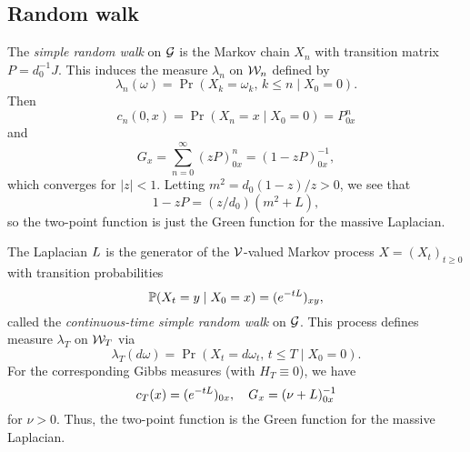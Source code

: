 
\subsection{Random walk}


The \emph{simple random walk} on $\mathcal{G}$ is the Markov chain $X_n$ with transition matrix $P = d_0^{-1} J$. This induces the measure $\lambda_n$ on $\mathcal{W}_n$ defined by
\begin{equation}
\lambda_n(\omega) = \Pr(X_k = \omega_k, \, k \le n \mid X_0 = 0).
\end{equation}
Then
\begin{equation}
c_n(0, x) = \Pr(X_n = x \mid X_0 = 0) = P^n_{0x}
\end{equation}
and
\begin{equation}
G_x = \sum_{n=0}^\infty (z P)^n_{0x} = (1 - z P)^{-1}_{0x},
\end{equation}
which converges for $|z| < 1$. Letting $m^2 = d_0 (1 - z) / z > 0$, we see that
\begin{equation}
1 - z P = (z / d_0) (m^2 + L),
\end{equation}
so the two-point function is just the Green function for the massive Laplacian.

The Laplacian $L$ is the generator of the $\mathcal{V}$-valued Markov process
$X = (X_t)_{t \ge 0}$ with transition probabilities
\begin{equation}
\operatorname{\mathbb{P}}(X_t = y \mid X_0 = x) = (e^{-t L})_{xy},
\end{equation}
called the \emph{continuous-time simple random walk} on $\mathcal{G}$.
This process defines measure $\lambda_T$ on $\mathcal{W}_T$ via
\begin{equation}
\lambda_T(d\omega) = \Pr(X_t = d\omega_t, \, t \le T \mid X_0 = 0).
\end{equation}
For the corresponding Gibbs measures (with $H_T \equiv 0$), we have
\begin{equation}
c_T(x) = (e^{-t L})_{0x},
  \quad
G_x = (\nu + L)^{-1}_{0x}
\end{equation}
for $\nu > 0$. Thus, the two-point function is the Green function for the
massive Laplacian.

